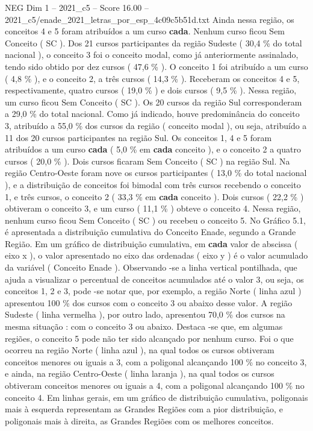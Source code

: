 \begin{textsample}{NEG Dim 1 – 2021\_c5 – Score 16.00 – 2021\_c5/enade\_2021\_letras\_por\_esp\_4c09c5b51d.txt}
Ainda nessa região, os conceitos 4 e 5 foram atribuídos a um curso \textbf{cada}.
Nenhum curso ficou Sem Conceito ( SC ).
Dos 21 cursos participantes da região Sudeste ( 30,4 \% do total nacional ), o conceito 3 foi o conceito modal, como já anteriormente assinalado, tendo sido obtido por dez cursos ( 47,6 \% ).
O conceito 1 foi atribuído a um curso ( 4,8 \% ), e o conceito 2, a três cursos ( 14,3 \% ).
Receberam os conceitos 4 e 5, respectivamente, quatro cursos ( 19,0 \% ) e dois cursos ( 9,5 \% ).
Nessa região, um curso ficou Sem Conceito ( SC ).
Os 20 cursos da região Sul corresponderam a 29,0 \% do total nacional.
Como já indicado, houve predominância do conceito 3, atribuído a 55,0 \% dos cursos da região ( conceito modal ), ou seja, atribuído a 11 dos 20 cursos participantes na região Sul.
Os conceitos 1, 4 e 5 foram atribuídos a um curso \textbf{cada} ( 5,0 \% em \textbf{cada} conceito ), e o conceito 2 a quatro cursos ( 20,0 \% ).
Dois cursos ficaram Sem Conceito ( SC ) na região Sul.
Na região Centro-Oeste foram nove os cursos participantes ( 13,0 \% do total nacional ), e a distribuição de conceitos foi bimodal com três cursos recebendo o conceito 1, e três cursos, o conceito 2 ( 33,3 \% em \textbf{cada} conceito ).
Dois cursos ( 22,2 \% ) obtiveram o conceito 3, e um curso ( 11,1 \% ) obteve o conceito 4.
Nessa região, nenhum curso ficou Sem Conceito ( SC ) ou recebeu o conceito 5.
No Gráfico 5.1, é apresentada a distribuição cumulativa do Conceito Enade, segundo a Grande Região.
Em um gráfico de distribuição cumulativa, em \textbf{cada} valor de abscissa ( eixo x ), o valor apresentado no eixo das ordenadas ( eixo y ) é o valor acumulado da variável ( Conceito Enade ).
Observando -se a linha vertical pontilhada, que ajuda a visualizar o percentual de conceitos acumulados até o valor 3, ou seja, os conceitos 1, 2 e 3, pode -se notar que, por exemplo, a região Norte ( linha azul ) apresentou 100 \% dos cursos com o conceito 3 ou abaixo desse valor.
A região Sudeste ( linha vermelha ), por outro lado, apresentou 70,0 \% dos cursos na mesma situação : com o conceito 3 ou abaixo.
Destaca -se que, em algumas regiões, o conceito 5 pode não ter sido alcançado por nenhum curso.
Foi o que ocorreu na região Norte ( linha azul ), na qual todos os cursos obtiveram conceitos menores ou iguais a 3, com a poligonal alcançando 100 \% no conceito 3, e ainda, na região Centro-Oeste ( linha laranja ), na qual todos os cursos obtiveram conceitos menores ou iguais a 4, com a poligonal alcançando 100 \% no conceito 4.
Em linhas gerais, em um gráfico de distribuição cumulativa, poligonais mais à esquerda representam as Grandes Regiões com a pior distribuição, e poligonais mais à direita, as Grandes Regiões com os melhores conceitos.

\end{textsample}
